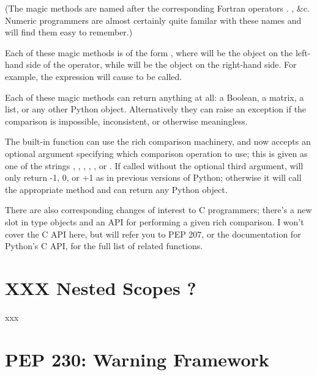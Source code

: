 \documentclass{howto}
\begin{document}
(The magic methods are named after the corresponding Fortran operators
. , \&c.  Numeric programmers are almost
certainly quite familar with these names and will find them easy to
remember.)
 
Each of these magic methods is of the form , where  will be the object on the left-hand side of
the operator, while  will be the object on the right-hand
side.  For example, the expression  will cause
 to be called.

Each of these magic methods can return anything at all: a Boolean, a
matrix, a list, or any other Python object.  Alternatively they can
raise an exception if the comparison is impossible, inconsistent, or
otherwise meaningless.

The built-in  function can use the rich comparison
machinery, and now accepts an optional argument specifying which
comparison operation to use; this is given as one of the strings
, , , , , or
.  If called without the optional third argument,
 will only return -1, 0, or +1 as in previous versions
of Python; otherwise it will call the appropriate method and can
return any Python object.

There are also corresponding changes of interest to C programmers;
there's a new slot  in type objects and an API for
performing a given rich comparison.  I won't cover the C API here, but
will refer you to PEP 207, or the documentation for Python's C API,
for the full list of related functions.

\begin{seealso}


\end{seealso}

\section{XXX Nested Scopes ?}

xxx

\section{PEP 230: Warning Framework}
\end{document}
